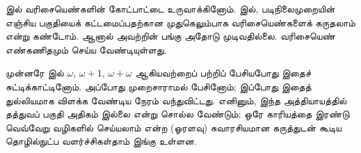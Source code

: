 \documentclass[../../../include/open-logic-section]{subfiles}
\begin{document}


 இல் வரிசையெண்களின் கோட்பாட்டை உருவாக்கினோம்.
 இல், படிநிலைமுறையின் எஞ்சிய பகுதியைக் கட்டமைப்பதற்கான
முதுகெலும்பாக வரிசையெண்களைக் கருதலாம் என்று கண்டோம். ஆனால் அவற்றின் பங்கு
அதோடு முடிவதில்லை. வரிசையெண் எண்கணிதமும் செய்ய வேண்டியுள்ளது.

முன்னரே  இல் $\omega$, $\omega+1$,
$\omega+\omega$ ஆகியவற்றைப் பற்றிப் பேசியபோது இதைச் சுட்டிக்காட்டினோம்.
அப்போது முறைசாராமல் பேசினோம்; இப்போது இதைத் துல்லியமாக விளக்க வேண்டிய
நேரம் வந்துவிட்டது. எனினும், இந்த அத்தியாயத்தில் தத்துவப் பகுதி அதிகம்
இல்லை என்று சொல்ல வேண்டும்: ஒரே காரியத்தை இரண்டு வெவ்வேறு வழிகளில்
செய்யலாம் என்ற (ஓரளவு) சுவாரசியமான கருத்துடன் கூடிய தொழில்நுட்ப
வளர்ச்சிகள்தாம் இங்கு உள்ளன.
\end{document}
